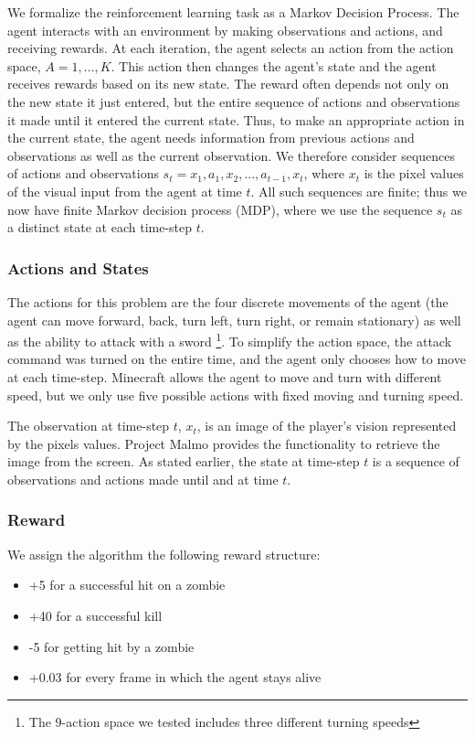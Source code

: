 \documentclass{article}
\begin{document}
\begin{multicols}{2}
We formalize the reinforcement learning task as a Markov Decision Process.
The agent interacts with an environment by making observations and actions, and receiving rewards.
At each iteration, the agent selects an action from the action space, $A = {1, \dots , K}$.
This action then changes the agent's state and the agent receives rewards based on its new state.
The reward often depends not only on the new state it just entered, but the entire sequence of actions and observations it made until it entered the current state.
Thus, to make an appropriate action in the current state, the agent needs information from previous actions and observations as well as the current observation.
We therefore consider sequences of actions and observations $s_t = x_1, a_1, x_2, ..., a_{t-1}, x_t$, where $x_t$ is the pixel values of the visual input from the agent at time $t$.
All such sequences are finite; thus we now have finite Markov decision process (MDP), where we use the sequence $s_t$ as a distinct state at each time-step $t$.

\subsubsection{Actions and States}

The actions for this problem are the four discrete movements of the agent (the agent can move forward, back, turn left, turn right, or remain stationary) as well as the ability to attack with a sword \footnote{The 9-action space we tested includes three different turning speeds}. To simplify the action space, the attack command was turned on the entire time, and the agent only chooses how to move at each time-step. Minecraft allows the agent to move and turn with different speed, but we only use five possible actions with fixed moving and turning speed.

The observation at time-step $t$, $x_t$, is an image of the player's vision represented by the pixels values.
Project Malmo provides the functionality to retrieve the image from the screen.
As stated earlier, the state at time-step $t$ is a sequence of observations and actions made until and at time $t$.


\subsubsection{Reward}

We assign the algorithm the following reward structure:
\begin{itemize}
    \item +5 for a successful hit on a zombie
    \item +40 for a successful kill
    \item -5 for getting hit by a zombie
    \item +0.03 for every frame in which the agent stays alive
\end{itemize}


\end{multicols}
\end{document}
